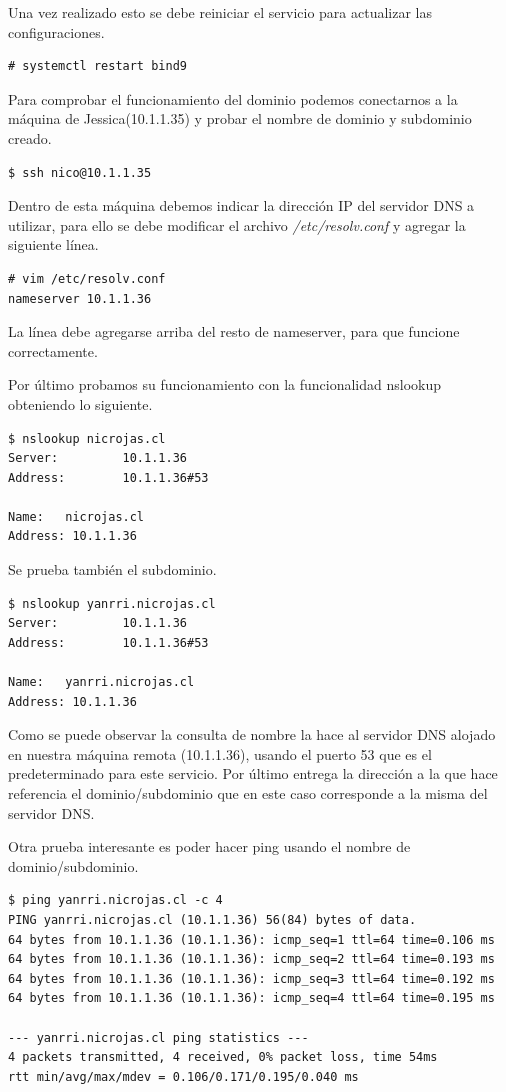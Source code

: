 \documentclass[12pt]{article}
\begin{document}
Una vez realizado esto se debe reiniciar el servicio para actualizar las configuraciones.
\begin{lstlisting}[frame=single]
# systemctl restart bind9
\end{lstlisting}

Para comprobar el funcionamiento del dominio podemos conectarnos a la máquina de Jessica(10.1.1.35) y probar el nombre de dominio y subdominio creado.

\begin{lstlisting}[frame=single]
$ ssh nico@10.1.1.35
\end{lstlisting}

Dentro de esta máquina debemos indicar la dirección IP del servidor DNS a utilizar, para ello se debe modificar el archivo \emph{/etc/resolv.conf} y agregar la siguiente línea.

\begin{lstlisting}[frame=single]
# vim /etc/resolv.conf
nameserver 10.1.1.36 
\end{lstlisting}

La línea debe agregarse arriba del resto de nameserver, para que funcione correctamente.

Por último probamos su funcionamiento con la funcionalidad nslookup obteniendo lo siguiente.
\begin{lstlisting}[frame=single]
$ nslookup nicrojas.cl
Server:         10.1.1.36
Address:        10.1.1.36#53

Name:   nicrojas.cl
Address: 10.1.1.36
\end{lstlisting}

Se prueba también el subdominio.
 \begin{lstlisting}[frame=single]
$ nslookup yanrri.nicrojas.cl
Server:         10.1.1.36
Address:        10.1.1.36#53

Name:   yanrri.nicrojas.cl
Address: 10.1.1.36
\end{lstlisting}

Como se puede observar la consulta de nombre la hace al servidor DNS alojado en nuestra máquina remota (10.1.1.36), usando el puerto 53 que es el predeterminado para este servicio. Por último entrega la dirección a la que hace referencia el dominio/subdominio que en este caso corresponde a la misma del servidor DNS.

Otra prueba interesante es poder hacer ping usando el nombre de dominio/subdominio.
 \begin{lstlisting}[frame=single]
$ ping yanrri.nicrojas.cl -c 4
PING yanrri.nicrojas.cl (10.1.1.36) 56(84) bytes of data.
64 bytes from 10.1.1.36 (10.1.1.36): icmp_seq=1 ttl=64 time=0.106 ms
64 bytes from 10.1.1.36 (10.1.1.36): icmp_seq=2 ttl=64 time=0.193 ms
64 bytes from 10.1.1.36 (10.1.1.36): icmp_seq=3 ttl=64 time=0.192 ms
64 bytes from 10.1.1.36 (10.1.1.36): icmp_seq=4 ttl=64 time=0.195 ms

--- yanrri.nicrojas.cl ping statistics ---
4 packets transmitted, 4 received, 0% packet loss, time 54ms
rtt min/avg/max/mdev = 0.106/0.171/0.195/0.040 ms
\end{lstlisting}
\end{document}
